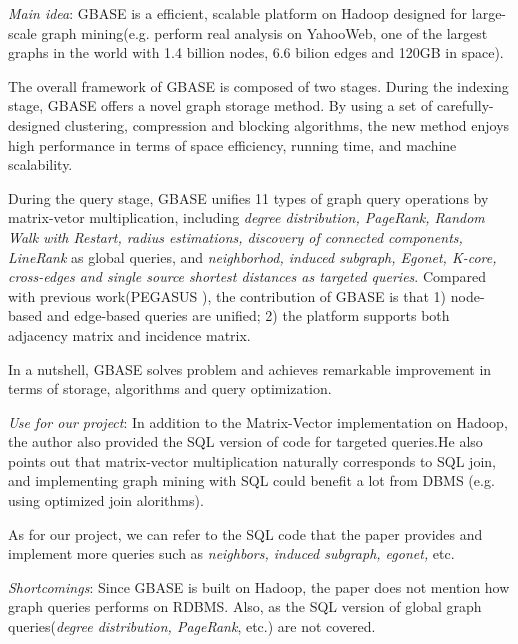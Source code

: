 \begin{itemize*}
\item {\em Main idea}: 
	  GBASE is a efficient, scalable platform on Hadoop designed for large-scale graph mining(e.g. perform real analysis on YahooWeb, one of the largest graphs in the world with 1.4 billion nodes, 6.6 bilion edges and 120GB in space). 
	  
	  The overall framework of GBASE is composed of two stages. 
	  During the indexing stage, GBASE offers a novel graph storage method. By using a set of carefully-designed clustering, compression and blocking algorithms, the new method enjoys high performance in terms of space efficiency, running time, and machine scalability. 

	  During the query stage, GBASE unifies 11 types of graph query operations by matrix-vetor multiplication, including {\em degree distribution, PageRank, Random Walk with Restart, radius estimations, discovery of connected components, LineRank} as global queries, and {\em neighborhod, induced subgraph, Egonet, K-core, cross-edges and single source shortest distances as targeted queries}. Compared with previous work(PEGASUS \cite{KangTF11}), the contribution of GBASE is that 1) node-based and edge-based queries are unified; 2) the platform supports both adjacency matrix and incidence matrix. 
	  
	  In a nutshell, GBASE solves problem and achieves remarkable improvement in terms of storage, algorithms and query optimization. 
\item {\em Use for our project}:
      In addition to the Matrix-Vector implementation on Hadoop, the author also provided the SQL version of code for targeted queries.He also points out that matrix-vector multiplication naturally corresponds to SQL join, and implementing graph mining with SQL could benefit a lot from DBMS (e.g. using optimized join alorithms). 

      As for our project, we can refer to the SQL code that the paper provides and implement more queries such as {\em neighbors, induced subgraph, egonet,} etc.
\item {\em Shortcomings}:
      Since GBASE is built on Hadoop, the paper does not mention how graph queries performs on RDBMS. Also, as the SQL version of global graph queries({\em degree distribution, PageRank}, etc.) are not covered.
\end{itemize*}

